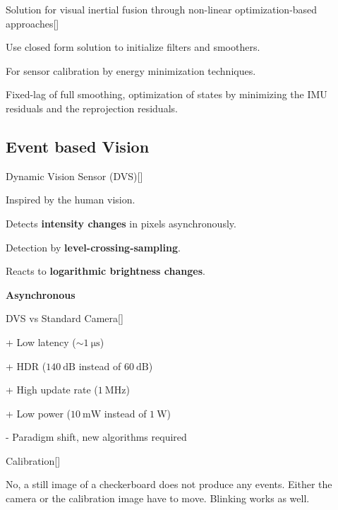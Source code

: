 \documentclass[10pt,a4paper]{scrartcl}
\begin{document}
\begin{multicols*}{2}
\begin{QandA}
{Solution for visual inertial fusion through non-linear optimization-based approaches}[\Application]
\item Use closed form solution to initialize filters and smoothers.
\item For sensor calibration by energy minimization techniques.
\item Fixed-lag of full smoothing, optimization of states by minimizing the IMU residuals and the reprojection residuals.
\end{QandA}

\subsection*{Event based Vision}

\begin{QandA}
{Dynamic Vision Sensor (DVS)}[\Definition]
\item Inspired by the human vision.
\item Detects \textbf{intensity changes} in pixels asynchronously.
\item Detection by \textbf{level-crossing-sampling}.
\item Reacts to \textbf{logarithmic brightness changes}.

\item \textbf{Asynchronous}
\end{QandA}

\begin{QandA}
{DVS vs Standard Camera}[\Comparison]
\item[+] Low latency ($\sim\SI{1}{\micro\second}$)
\item[+] HDR ($\SI{140}{\dB}$ instead of $\SI{60}{\dB}$)
\item[+] High update rate ($\SI{1}{\mega\hertz}$)
\item[+] Low power ($\SI{10}{\milli\watt}$ instead of $\SI{1}{\watt}$)
\item[-] Paradigm shift, new algorithms required
\end{QandA}

\begin{QandA}
{Calibration}[\Application]
\item No, a still image of a checkerboard does not produce any events. Either the camera or the calibration image have to move. Blinking works as well.
\end{QandA}


\end{multicols*}
\end{document}
